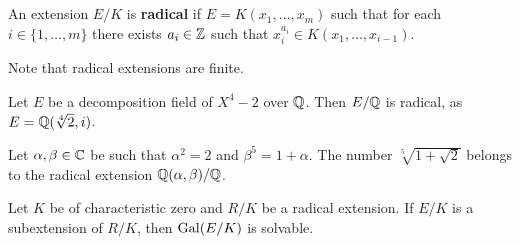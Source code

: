 \chapter{}


\begin{definition}
    An extension $E/K$ is \textbf{radical} if $E=K(x_1,\dots,x_m)$ 
    such that for each $i\in\{1,\dots,m\}$ there exists $a_i\in\mathbb{Z}$ 
    such that $x_i^{a_i}\in K(x_1,\dots,x_{i-1})$. 
\end{definition}

Note that radical extensions are finite. 

\begin{example}
    Let $E$ be a decomposition field of $X^4-2$ over $\mathbb{Q}$. Then $E/\mathbb{Q}$ is radical, 
    as $E=\mathbb{Q}(\sqrt[4]{2},i)$. 
\end{example}

\begin{example}
    Let $\alpha,\beta\in\mathbb{C}$ be such that $\alpha^2=2$ and 
    $\beta^5=1+\alpha$. 
    The number $\sqrt[5]{1+\sqrt{2}}$ belongs to the radical extension $\mathbb{Q}(\alpha,\beta)/\mathbb{Q}$. 
\end{example}

\begin{theorem}
\label{thm:by_radicals}
    Let $K$ be of characteristic zero and 
    $R/K$ be a radical extension. If $E/K$ is a subextension of $R/K$, 
    then $\operatorname{Gal}(E/K)$ is solvable. 
\end{theorem}

